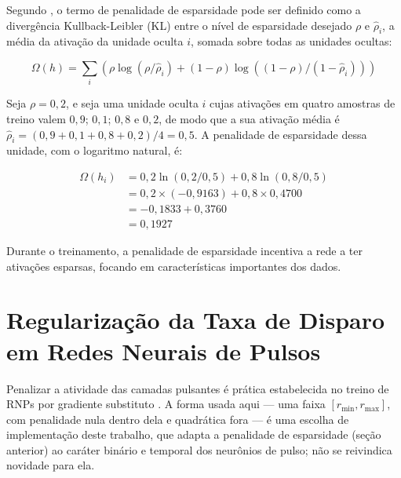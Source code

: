 \begin{apendicesenv}
		\par Segundo , o termo de penalidade de esparsidade pode ser definido como a divergência Kullback-Leibler (KL) entre o nível de esparsidade desejado \( \rho \) e $\hat{\rho}_i$, a média da ativação da unidade oculta $i$, somada sobre todas as unidades ocultas:

		\begin{equation}
			\Omega(h) = \sum_i \left(\rho \log(\rho / \hat{\rho}_i) + (1 - \rho) \log((1 - \rho) / (1 - \hat{\rho}_i))\right)
		\end{equation}

		\par Seja $\rho = 0{,}2$, e seja uma unidade oculta $i$ cujas ativações em quatro amostras de treino valem $0{,}9$; $0{,}1$; $0{,}8$ e $0{,}2$, de modo que a sua ativação média é $\hat{\rho}_i = (0{,}9+0{,}1+0{,}8+0{,}2)/4 = 0{,}5$. A penalidade de esparsidade dessa unidade, com o logaritmo natural, é:
		
		\begin{equation}
			\begin{aligned}
				\Omega(h_i) &= 0{,}2 \ln(0{,}2 / 0{,}5) + 0{,}8 \ln(0{,}8 / 0{,}5) \\
							&= 0{,}2 \times (-0{,}9163) + 0{,}8 \times 0{,}4700 \\
							&= -0{,}1833 + 0{,}3760 \\
							&= 0{,}1927 
			\end{aligned}
		\end{equation}
		\par Durante o treinamento, a penalidade de esparsidade incentiva a rede a ter ativações esparsas, focando em características importantes dos dados.

	\section{Regularização da Taxa de Disparo em Redes Neurais de Pulsos}
		\label{Apend:firingRateReg}
		\par Penalizar a atividade das camadas pulsantes é prática estabelecida no treino de RNPs por gradiente substituto \cite{zenke2021remarkable}. A forma usada aqui --- uma faixa $[r_{\min}, r_{\max}]$, com penalidade nula dentro dela e quadrática fora --- é uma escolha de implementação deste trabalho, que adapta a penalidade de esparsidade (seção anterior) ao caráter binário e temporal dos neurônios de pulso; não se reivindica novidade para ela.


\end{apendicesenv}
